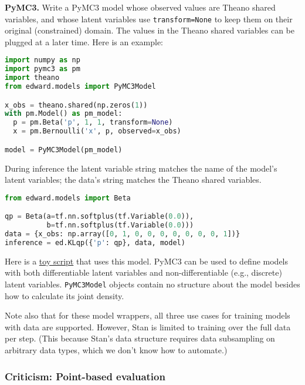 \textbf{PyMC3.}
Write a PyMC3 model whose observed values are Theano shared variables,
and whose latent variables use \texttt{transform=None} to keep them on their
original (constrained) domain.
The values in the Theano shared variables can be plugged at a later
time. Here is an example:

\begin{lstlisting}[language=Python]
import numpy as np
import pymc3 as pm
import theano
from edward.models import PyMC3Model

x_obs = theano.shared(np.zeros(1))
with pm.Model() as pm_model:
  p = pm.Beta('p', 1, 1, transform=None)
  x = pm.Bernoulli('x', p, observed=x_obs)

model = PyMC3Model(pm_model)
\end{lstlisting}

During inference the latent variable string matches the name of the
model's latent variables; the data's string matches the Theano shared
variables.

\begin{lstlisting}[language=Python]
from edward.models import Beta

qp = Beta(a=tf.nn.softplus(tf.Variable(0.0)),
          b=tf.nn.softplus(tf.Variable(0.0)))
data = {x_obs: np.array([0, 1, 0, 0, 0, 0, 0, 0, 0, 1])}
inference = ed.KLqp({'p': qp}, data, model)
\end{lstlisting}

Here is a
\href{https://github.com/blei-lab/edward/blob/master/examples/pymc3_beta_bernoulli.py}
{toy script}
that uses this model. PyMC3 can be used to define models with both
differentiable latent variables and non-differentiable (e.g., discrete)
latent variables. \texttt{PyMC3Model} objects contain no structure about the
model besides how to calculate its joint density.

Note also that for these model wrappers,
all three use cases for training models with data are supported. However,
Stan is limited to training over the full data per step. (This
because Stan's data structure requires data subsampling on arbitrary
data types, which we don't know how to automate.)

\subsubsection{Criticism: Point-based evaluation}

